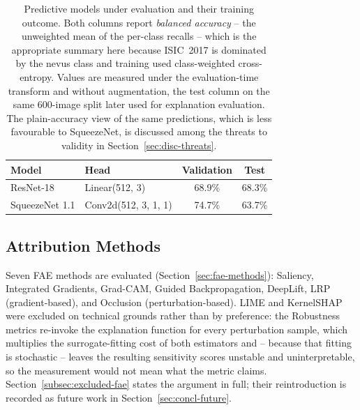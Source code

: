 \begin{table}[H]
\centering
\caption{Predictive models under evaluation and their training outcome.
Both columns report \emph{balanced accuracy} -- the unweighted mean of the
per-class recalls -- which is the appropriate summary here because ISIC~2017
is dominated by the nevus class and training used class-weighted
cross-entropy. Values are measured under the evaluation-time transform and
without augmentation, the test column on the same 600-image split later used
for explanation evaluation. The plain-accuracy view of the same predictions,
which is less favourable to SqueezeNet, is discussed among the threats to
validity in Section~\ref{sec:disc-threats}.}
\begin{tabular}{llcc}
\toprule
Model & Head & Validation & Test \\
\midrule
ResNet-18      & Linear(512, 3)        & 68.9\% & 68.3\% \\
SqueezeNet 1.1 & Conv2d(512, 3, 1, 1)  & 74.7\% & 63.7\% \\
\bottomrule
\end{tabular}
\label{tab:model-summary}
\end{table}

\subsection{Attribution Methods}

Seven FAE methods are evaluated (Section~\ref{sec:fae-methods}): Saliency,
Integrated Gradients, Grad-CAM, Guided Backpropagation, DeepLift, LRP
(gradient-based), and Occlusion (perturbation-based). LIME and KernelSHAP were
excluded on technical grounds rather than by preference: the Robustness
metrics re-invoke the explanation function for every perturbation sample,
which multiplies the surrogate-fitting cost of both estimators and -- because
that fitting is stochastic -- leaves the resulting sensitivity scores unstable
and uninterpretable, so the measurement would not mean what the metric claims.
Section~\ref{subsec:excluded-fae} states the argument in full; their
reintroduction is recorded as future work in Section~\ref{sec:concl-future}.

